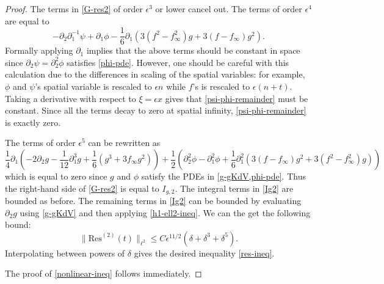 \begin{proof}
	The terms in \cref{G-res2} of order \(\epsilon^3\) or lower cancel out. The terms of order \(\epsilon^4\) are equal to 
	\begin{equation}\label{psi-phi-remainder}
		-\partial_2 \partial_1^{-1} \psi+ \partial_1 \phi  - \frac 1 6 \partial_1(3(f^2 - f_\infty^2) g + 3(f-f_\infty) g^2).
	\end{equation}
	Formally applying \(\partial_1\) implies that the above terms should be constant in space since \(\partial_2 \psi = \partial_2^2 \phi\) satisfies \cref{phi-pde}. However, one should be careful with this calculation due to the differences in scaling of the spatial variables: for example, \(\phi\) and \(\psi\)'s spatial variable is rescaled to \(\epsilon n\) while \(f\)'s is rescaled to \(\epsilon(n+t)\). Taking a derivative with respect to \(\xi = \epsilon x\) gives that \cref{psi-phi-remainder} must be constant. Since all the terms decay to zero at spatial infinity, \cref{psi-phi-remainder} is exactly zero.
	
	The terms of order \(\epsilon^5\) can be rewritten as
	\begin{equation}
		\frac 1 4 \partial_1( - 2 \partial_2 g - \frac 1 {12} \partial_1^3 g + \frac 1 6 (g^3 + 3f_\infty g^2)) + \frac 1 2 (\partial_2^2\phi - \partial_1^2\phi + \frac 1 6 \partial_1^2(3(f-f_\infty )g^2 + 3 (f^2-f_\infty^2)g))
	\end{equation}
	which is equal to zero since \(g\) and \(\phi\) satisfy the PDEs in \cref{g-gKdV,phi-pde}. Thus the right-hand side of \cref{G-res2} is equal to \(I_{g,2}\). The integral terms in \cref{Ig2} are bounded as before. The remaining terms in \cref{Ig2} can be bounded by evaluating \(\partial_2 g\) using \cref{g-gKdV} and then applying \cref{h1-ell2-ineq}. We can the get the following bound: \[\| \mathrm{Res}^{(2)}(t) \|_{\ell^2} \leq C \epsilon^{11/2} (\delta + \delta^3 + \delta^5).\] Interpolating between powers of \(\delta\) gives the desired inequality \cref{res-ineq}.
	
	The proof of \cref{nonlinear-ineq} follows immediately.
\end{proof}

